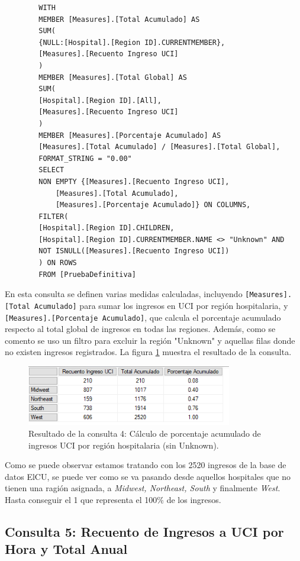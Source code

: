 \documentclass[12pt, a4paper, twoside]{article}
\begin{document}
	\begin{verbatim}
		WITH 
		MEMBER [Measures].[Total Acumulado] AS
		SUM(
		{NULL:[Hospital].[Region ID].CURRENTMEMBER}, 
		[Measures].[Recuento Ingreso UCI]
		)
		MEMBER [Measures].[Total Global] AS
		SUM(
		[Hospital].[Region ID].[All], 
		[Measures].[Recuento Ingreso UCI]
		)
		MEMBER [Measures].[Porcentaje Acumulado] AS
		[Measures].[Total Acumulado] / [Measures].[Total Global],
		FORMAT_STRING = "0.00" 
		SELECT 
		NON EMPTY {[Measures].[Recuento Ingreso UCI], 
			[Measures].[Total Acumulado], 
			[Measures].[Porcentaje Acumulado]} ON COLUMNS,
		FILTER(
		[Hospital].[Region ID].CHILDREN,
		[Hospital].[Region ID].CURRENTMEMBER.NAME <> "Unknown" AND 
		NOT ISNULL([Measures].[Recuento Ingreso UCI])
		) ON ROWS
		FROM [PruebaDefinitiva]
	\end{verbatim}
	
	En esta consulta se definen varias medidas calculadas, incluyendo \texttt{[Measures].[Total Acumulado]} para sumar los ingresos en UCI por región hospitalaria, y \texttt{[Measures].[Porcentaje Acumulado]}, que calcula el porcentaje acumulado respecto al total global de ingresos en todas las regiones. Además, como se comento se uso un filtro para excluir la región "Unknown" y aquellas filas donde no existen ingresos registrados. La figura \ref{fig:consulta4} muestra el resultado de la consulta.
	
	\begin{figure}[H]
		\centering
		\includegraphics[width=0.8\textwidth]{image/consulta4.png}
		\caption{Resultado de la consulta 4: Cálculo de porcentaje acumulado de ingresos UCI por región hospitalaria (sin Unknown).}
		\label{fig:consulta4}
	\end{figure}
	
	Como se puede observar estamos tratando con los 2520 ingresos de la base de datos ElCU, se puede ver como se va pasando desde aquellos hospitales que no tienen una ragión asignada, a \textit{Midwest, Northeast, South} y finalmente \textit{West}. Hasta conseguir el 1 que representa el 100\% de los ingresos.
	
	\subsection{Consulta 5: Recuento de Ingresos a UCI por Hora y Total Anual}
	
\end{document}
